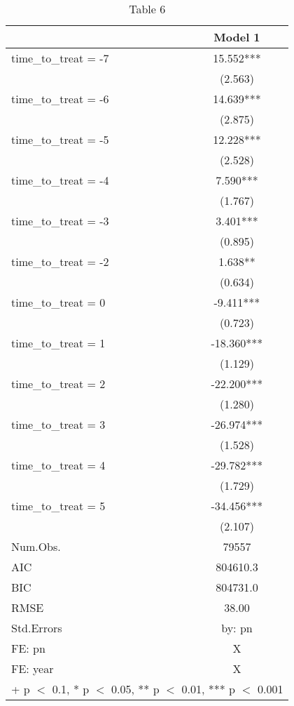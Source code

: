\begin{table}

\caption{Table 6}
\centering
\begin{tabular}[t]{lc}
\toprule
  & Model 1\\
\midrule
time\_to\_treat = -7 & 15.552***\\
 & (2.563)\\
time\_to\_treat = -6 & 14.639***\\
 & (2.875)\\
time\_to\_treat = -5 & 12.228***\\
 & (2.528)\\
time\_to\_treat = -4 & 7.590***\\
 & (1.767)\\
time\_to\_treat = -3 & 3.401***\\
 & (0.895)\\
time\_to\_treat = -2 & 1.638**\\
 & (0.634)\\
time\_to\_treat = 0 & -9.411***\\
 & (0.723)\\
time\_to\_treat = 1 & -18.360***\\
 & (1.129)\\
time\_to\_treat = 2 & -22.200***\\
 & (1.280)\\
time\_to\_treat = 3 & -26.974***\\
 & (1.528)\\
time\_to\_treat = 4 & -29.782***\\
 & (1.729)\\
time\_to\_treat = 5 & -34.456***\\
 & (2.107)\\
\midrule
Num.Obs. & 79557\\
AIC & 804610.3\\
BIC & 804731.0\\
RMSE & 38.00\\
Std.Errors & by: pn\\
FE: pn & X\\
FE: year & X\\
\bottomrule
\multicolumn{2}{l}{\rule{0pt}{1em}+ p $<$ 0.1, * p $<$ 0.05, ** p $<$ 0.01, *** p $<$ 0.001}\\
\end{tabular}
\end{table}
